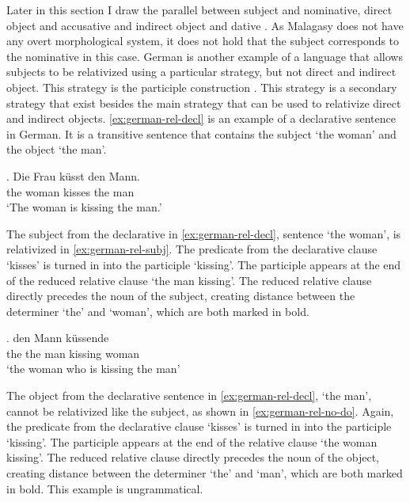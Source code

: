 Later in this section I draw the parallel between subject and nominative, direct object and accusative and indirect object and dative \citep[after][]{caha2009}. As Malagasy does not have any overt morphological system, it does not hold that the subject corresponds to the nominative in this case.
German is another example of a language that allows subjects to be relativized using a particular strategy, but not direct and indirect object. This strategy is the participle construction \citep{keenan1977}. This strategy is a secondary strategy that exist besides the main strategy that can be used to relativize direct and indirect objects. \ref{ex:german-rel-decl} is an example of a declarative sentence in German. It is a transitive sentence that contains the subject  `the woman' and the object  `the man'.

\exg. Die Frau küsst den Mann.\\
the woman kisses the man\\
`The woman is kissing the man.' \label{ex:german-rel-decl}

The subject from the declarative in \ref{ex:german-rel-decl}, sentence  `the woman', is relativized in \ref{ex:german-rel-subj}. The predicate from the declarative clause  `kisses' is turned in into the participle  `kissing'. The participle appears at the end of the reduced relative clause  `the man kissing'. The reduced relative clause directly precedes the noun of the subject, creating distance between the determiner  `the' and  `woman', which are both marked in bold.

\exg.  den Mann küssende \\
 the the man kissing woman\\
 `the woman who is kissing the man' \label{ex:german-rel-subj}

The object from the declarative sentence in \ref{ex:german-rel-decl},  `the man', cannot be relativized like the subject, as shown in \ref{ex:german-rel-no-do}. Again, the predicate from the declarative clause  `kisses' is turned in into the participle  `kissing'. The participle appears at the end of the relative clause  `the woman kissing'. The reduced relative clause directly precedes the noun of the object, creating distance between the determiner  `the' and  `man', which are both marked in bold. This example is ungrammatical.

